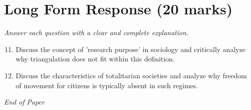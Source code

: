 \documentclass[12pt]{article}
\begin{document}
\section*{Long Form Response (20 marks)}
\textit{Answer each question with a clear and complete explanation.}
\begin{enumerate}[label=\arabic*.]
\setcounter{enumi}{10}
\item Discuss the concept of 'research purpose' in sociology and critically analyze why triangulation does not fit within this definition.
\item Discuss the characteristics of totalitarian societies and analyze why freedom of movement for citizens is typically absent in such regimes.
\end{enumerate}

\vfill
\noindent\textit{End of Paper}
\end{document}

